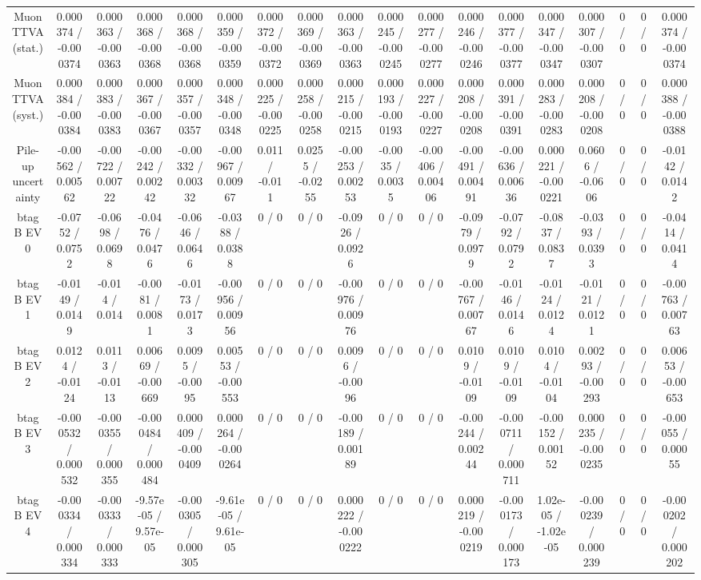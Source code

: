 \documentclass[10pt]{article}
\begin{document}
\begin{table}[htbp]
\begin{center}
\begin{tabular}{|c|c|c|c|c|c|c|c|c|c|c|c|c|c|c|c|c|c|}
  Muon TTVA (stat.) & 0.000374 / -0.000374 & 0.000363 / -0.000363 & 0.000368 / -0.000368 & 0.000368 / -0.000368 & 0.000359 / -0.000359 & 0.000372 / -0.000372 & 0.000369 / -0.000369 & 0.000363 / -0.000363 & 0.000245 / -0.000245 & 0.000277 / -0.000277 & 0.000246 / -0.000246 & 0.000377 / -0.000377 & 0.000347 / -0.000347 & 0.000307 / -0.000307 & 0 / 0 & 0 / 0 & 0.000374 / -0.000374 \\ 
  Muon TTVA (syst.) & 0.000384 / -0.000384 & 0.000383 / -0.000383 & 0.000367 / -0.000367 & 0.000357 / -0.000357 & 0.000348 / -0.000348 & 0.000225 / -0.000225 & 0.000258 / -0.000258 & 0.000215 / -0.000215 & 0.000193 / -0.000193 & 0.000227 / -0.000227 & 0.000208 / -0.000208 & 0.000391 / -0.000391 & 0.000283 / -0.000283 & 0.000208 / -0.000208 & 0 / 0 & 0 / 0 & 0.000388 / -0.000388 \\ 
  Pile-up uncertainty & -0.00562 / 0.00562 & -0.00722 / 0.00722 & -0.00242 / 0.00242 & -0.00332 / 0.00332 & -0.00967 / 0.00967 & 0.011 / -0.011 & 0.0255 / -0.0255 & -0.00253 / 0.00253 & -0.0035 / 0.0035 & -0.00406 / 0.00406 & -0.00491 / 0.00491 & -0.00636 / 0.00636 & 0.000221 / -0.000221 & 0.0606 / -0.0606 & 0 / 0 & 0 / 0 & -0.0142 / 0.0142 \\ 
  btag B EV 0 & -0.0752 / 0.0752 & -0.0698 / 0.0698 & -0.0476 / 0.0476 & -0.0646 / 0.0646 & -0.0388 / 0.0388 & 0 / 0 & 0 / 0 & -0.0926 / 0.0926 & 0 / 0 & 0 / 0 & -0.0979 / 0.0979 & -0.0792 / 0.0792 & -0.0837 / 0.0837 & -0.0393 / 0.0393 & 0 / 0 & 0 / 0 & -0.0414 / 0.0414 \\ 
  btag B EV 1 & -0.0149 / 0.0149 & -0.014 / 0.014 & -0.0081 / 0.0081 & -0.0173 / 0.0173 & -0.00956 / 0.00956 & 0 / 0 & 0 / 0 & -0.00976 / 0.00976 & 0 / 0 & 0 / 0 & -0.00767 / 0.00767 & -0.0146 / 0.0146 & -0.0124 / 0.0124 & -0.0121 / 0.0121 & 0 / 0 & 0 / 0 & -0.00763 / 0.00763 \\ 
  btag B EV 2 & 0.0124 / -0.0124 & 0.0113 / -0.0113 & 0.00669 / -0.00669 & 0.0095 / -0.0095 & 0.00553 / -0.00553 & 0 / 0 & 0 / 0 & 0.0096 / -0.0096 & 0 / 0 & 0 / 0 & 0.0109 / -0.0109 & 0.0109 / -0.0109 & 0.0104 / -0.0104 & 0.00293 / -0.00293 & 0 / 0 & 0 / 0 & 0.00653 / -0.00653 \\ 
  btag B EV 3 & -0.000532 / 0.000532 & -0.000355 / 0.000355 & -0.000484 / 0.000484 & 0.000409 / -0.000409 & 0.000264 / -0.000264 & 0 / 0 & 0 / 0 & -0.00189 / 0.00189 & 0 / 0 & 0 / 0 & -0.00244 / 0.00244 & -0.000711 / 0.000711 & -0.00152 / 0.00152 & 0.000235 / -0.000235 & 0 / 0 & 0 / 0 & -0.00055 / 0.00055 \\ 
  btag B EV 4 & -0.000334 / 0.000334 & -0.000333 / 0.000333 & -9.57e-05 / 9.57e-05 & -0.000305 / 0.000305 & -9.61e-05 / 9.61e-05 & 0 / 0 & 0 / 0 & 0.000222 / -0.000222 & 0 / 0 & 0 / 0 & 0.000219 / -0.000219 & -0.000173 / 0.000173 & 1.02e-05 / -1.02e-05 & -0.000239 / 0.000239 & 0 / 0 & 0 / 0 & -0.000202 / 0.000202 \\ 

\end{tabular}
\end{center}
\end{table}
\end{document}
